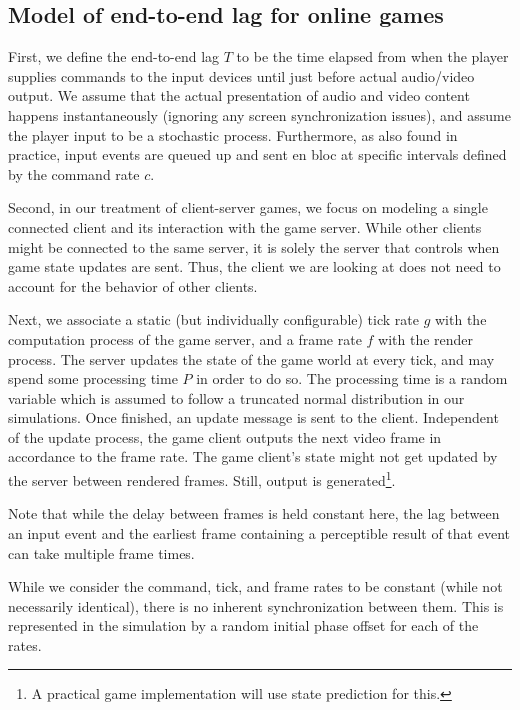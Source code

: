 \subsection{Model of end-to-end lag for online games}
First, we define the end-to-end lag $T$ to be the time elapsed 
from when the player supplies commands to the input devices until just 
before actual audio/video output.
We assume that the actual presentation of 
audio and video content happens instantaneously  
(ignoring any screen synchronization issues), and assume the player 
input to be a stochastic process. %
Furthermore, as also found in practice, input events are queued up  
and sent en bloc at specific intervals defined by the command rate $c$.

Second, in our treatment of client-server games, we focus on modeling 
a single connected client and its interaction with the game server. 
While other clients might be connected to the same server, it is 
solely the server that controls when game state updates are sent. 
Thus, the client we are looking at does not need to account for the 
behavior of other clients.

Next, we associate a static (but individually configurable) tick 
rate $g$ with the computation process of the game server, and a frame rate $f$
with the render process. 
The server updates the state of the game world at every tick, and may 
spend some processing time $P$ in order to do so. The processing time is a random variable which is assumed to follow a truncated normal distribution in our simulations. Once finished, an update 
message is sent to the client.
Independent of the update process, the game client outputs the next 
video frame in accordance to the frame rate. The game client's state 
might not get updated by the server between rendered frames. Still, 
output is generated\footnote{A practical game implementation will use state prediction for this.}.

Note that while the delay between frames is held constant here,
the lag between an input event and the earliest frame containing a perceptible 
result of that event can take multiple frame times.

While we consider the command, tick, and frame rates to be constant 
(while not necessarily identical), there is no inherent synchronization 
between them. This is represented in the simulation by a random initial 
phase offset for each of the rates.

